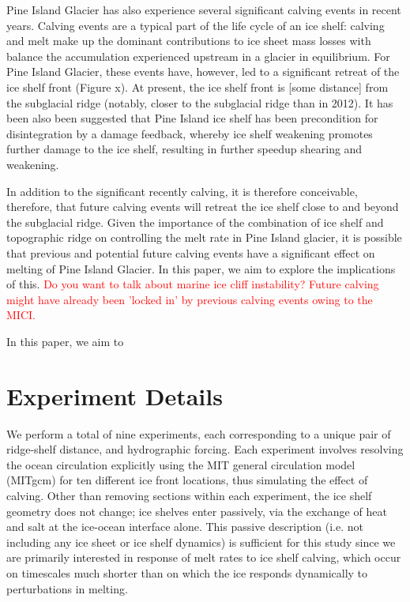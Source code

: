 \documentclass[draft]{agujournal2019}
\newcommand{\red}[1]{\textcolor{red}{#1}}
\begin{document}
Pine Island Glacier has also experience several significant calving events in recent years. Calving events are a typical part of the life cycle of an ice shelf: calving and melt make up the dominant contributions to ice sheet mass losses with balance the accumulation experienced upstream in a glacier in equilibrium. For Pine Island Glacier, these events have, however, led to a significant retreat of the ice shelf front (Figure x). At present, the ice shelf front is [some distance] from the subglacial ridge (notably, closer to the subglacial ridge than in 2012). It has been also been suggested that Pine Island ice shelf has been precondition for disintegration by a damage feedback, whereby ice shelf weakening promotes further damage to the ice shelf, resulting in further speedup shearing and weakening. 

In addition to the significant recently calving, it is therefore conceivable, therefore, that future calving events will retreat the ice shelf close to and beyond the subglacial ridge. Given the importance of the combination of ice shelf and topographic ridge on controlling the melt rate in Pine Island glacier, it is possible that previous and potential future calving events have a significant effect on melting of Pine Island Glacier. In this paper, we aim to explore the implications of this.
\red{Do you want to talk about marine ice cliff instability? Future calving might have already been 'locked in' by previous calving events owing to the MICI.}

In this paper, we aim to 

\section{Experiment Details}
We perform a total of nine experiments, each corresponding to a unique pair of ridge-shelf distance, and hydrographic forcing. Each experiment involves resolving the ocean circulation explicitly using the MIT general circulation model (MITgcm) for ten different ice front locations, thus simulating the effect of calving. Other than removing sections within each experiment, the ice shelf geometry does not change; ice shelves enter passively, via the exchange of heat and salt at the ice-ocean interface alone. This passive description (i.e. not including any ice sheet or ice shelf dynamics) is sufficient for this study since we are primarily interested in response of melt rates to ice shelf calving, which occur on timescales much shorter than on which the ice responds dynamically to perturbations in melting.
\end{document}
